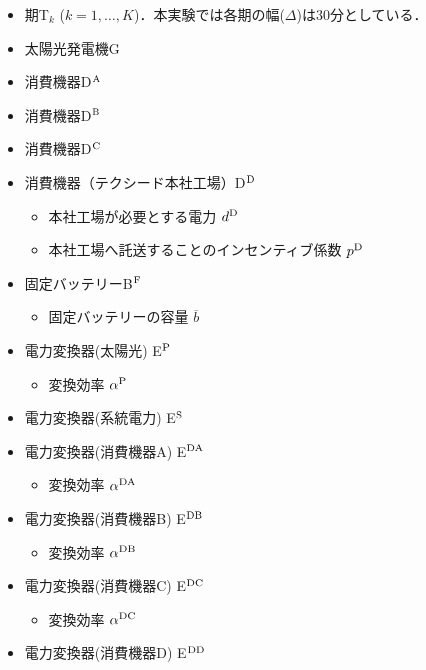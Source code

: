 \documentclass{jarticle}
\newcommand{\IB}{$\bullet$}
\newcommand{\IS}{$*$}
\begin{document}
\begin{itemize}
 \item[\IS] 期T$_k$ ($k=1,\ldots,K$)．本実験では各期の幅($\Delta$)は$30$分としている．
 \item[\IS] 太陽光発電機G
 \item[\IS] 消費機器D$^{\rm A}$
 \item[\IS] 消費機器D$^{\rm B}$
 \item[\IS] 消費機器D$^{\rm C}$
 \item[\IS] 消費機器（テクシード本社工場）D$^{\rm D}$
   \begin{itemize}
   \item[\IB] 本社工場が必要とする電力 $d^{\rm D}$
   \item[\IB] 本社工場へ託送することのインセンティブ係数 $p^{\rm D}$   
  \end{itemize} 
 \item[\IS] 固定バッテリーB$^{\rm F}$
  \begin{itemize}
   \item[\IB] 固定バッテリーの容量 $\overline{b}$
  \end{itemize}
 \item[\IS] 電力変換器(太陽光) E$^{\rm P}$
  \begin{itemize}
   \item[\IB] 変換効率 $\alpha^{\rm P}$
  \end{itemize}
 \item[\IS] 電力変換器(系統電力) E$^{\rm S}$
 \item[\IS] 電力変換器(消費機器A) E$^{\rm DA}$
  \begin{itemize}
   \item[\IB] 変換効率 $\alpha^{\rm DA}$
  \end{itemize}
 \item[\IS] 電力変換器(消費機器B) E$^{\rm DB}$
  \begin{itemize}
   \item[\IB] 変換効率 $\alpha^{\rm DB}$
  \end{itemize}
 \item[\IS] 電力変換器(消費機器C) E$^{\rm DC}$
  \begin{itemize}
   \item[\IB] 変換効率 $\alpha^{\rm DC}$
  \end{itemize}
  \item[\IS] 電力変換器(消費機器D) E$^{\rm DD}$

\end{itemize}
\end{document}
